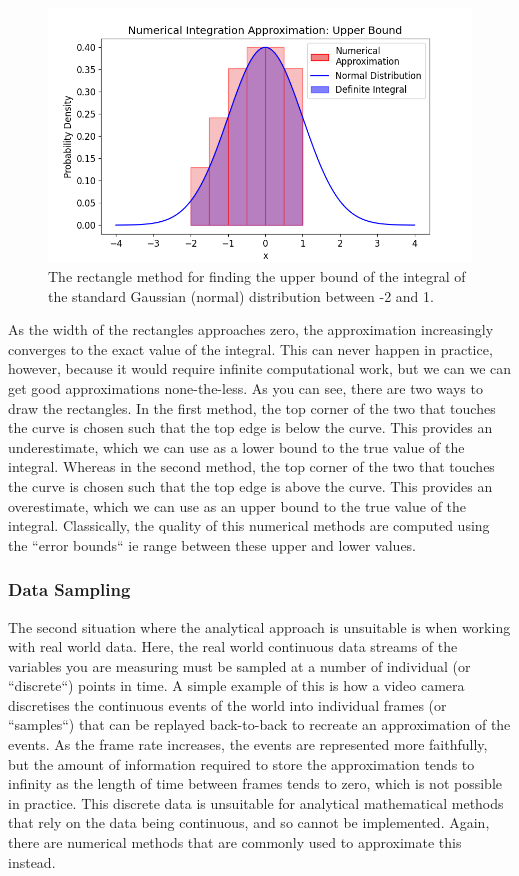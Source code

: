 \documentclass[12pt]{article}
\newcommand{\ndiFigCaption}[1]{The rectangle method for finding the #1 bound of the integral of the standard Gaussian (normal) distribution between -2 and 1.}
\begin{document}
    \FloatBarrier

    \begin{figure}[htbp]
        \centering
        \includegraphics[width=0.8\linewidth]{figures/ndi-num2/ndi-num2_}
        \caption{\ndiFigCaption{upper}}
        \label{fig:ndi-num2_}
    \end{figure}
    As the width of the rectangles approaches zero, the approximation increasingly converges to the exact value of the integral.
    This can never happen in practice, however, because it would require infinite computational work, but we can we can get good approximations none-the-less.
    As you can see, there are two ways to draw the rectangles.
    In the first method, the top corner of the two that touches the curve is chosen such that the top edge is below the curve.
    This provides an underestimate, which we can use as a lower bound to the true value of the integral.
    Whereas in the second method, the top corner of the two that touches the curve is chosen such that the top edge is above the curve.
    This provides an overestimate, which we can use as an upper bound to the true value of the integral.
    Classically, the quality of this numerical methods are computed using the ``error bounds`` ie range between these upper and lower values.

    \subsubsection{Data Sampling}
    The second situation where the analytical approach is unsuitable is when working with real world data.
    Here, the real world continuous data streams of the variables you are measuring must be sampled at a number of individual (or ``discrete``) points in time.
    A simple example of this is how a video camera discretises the continuous events of the world into individual frames (or ``samples``) that can be replayed back-to-back to recreate an approximation of the events.
    As the frame rate increases, the events are represented more faithfully, but the amount of information required to store the approximation tends to infinity as the length of time between frames tends to zero, which is not possible in practice.
    This discrete data is unsuitable for analytical mathematical methods that rely on the data being continuous, and so cannot be implemented.
    Again, there are numerical methods that are commonly used to approximate this instead.
\end{document}
